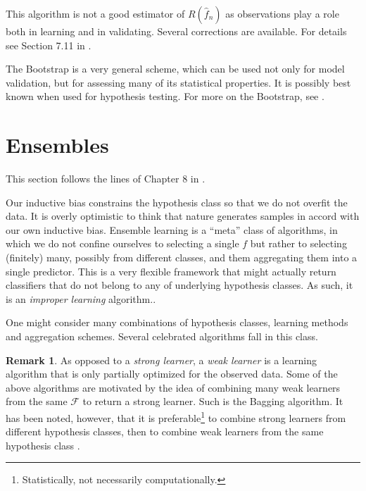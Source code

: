 \documentclass[12pt,a4paper]{article}
\theoremstyle{plain}
\theoremstyle{definition}
\newtheorem{remark}{Remark}
\newcommand{\risk}{R}
\newcommand{\hyp}{f}
\newcommand{\hypclass}{\mathcal{F}}
\newcommand{\EPE}{\risk(\hat{\hyp}_n)}
\begin{document}
This algorithm is not a good estimator of $\EPE$ as observations play a role both in learning and in validating. 
Several corrections are available. For details see Section 7.11 in \cite{hastie_elements_2003}.

The Bootstrap is a very general scheme, which can be used not only for model validation, but for assessing many of its statistical properties. It is possibly best known when used for hypothesis testing. 
For more on the Bootstrap, see \cite{efron_introduction_1994}.


\section{Ensembles}
\label{sec:ensembles}

This section follows the lines of Chapter 8 in \cite{hastie_elements_2003}.

Our inductive bias constrains the hypothesis class so that we do not overfit the data. 
It is overly optimistic to think that nature generates samples in accord with our own inductive bias.
Ensemble learning is a ``meta'' class of algorithms, in which we do not confine ourselves to selecting a single $\hyp$ but rather to selecting (finitely) many, possibly from different classes, and them aggregating them into a single predictor.
This is a very flexible framework that might actually return classifiers that do not belong to any of underlying hypothesis classes. As such, it is an \emph{improper learning} algorithm..

One might consider many combinations of hypothesis classes, learning methods and aggregation schemes.
Several celebrated algorithms fall in this class. 



\begin{remark}
As opposed to a \emph{strong learner}, a \emph{weak learner} is a learning algorithm that is only partially optimized for the observed data. 
Some of the above algorithms are motivated by the idea of combining many weak learners from the same $\hypclass$ to return a strong learner. 
Such is the Bagging algorithm. 
It has been noted, however, that it is preferable\footnote{Statistically, not necessarily computationally.}  to combine strong learners from different hypothesis classes, then to combine weak learners from the same hypothesis class \cite{gashler_decision_2008}.
\end{remark}
\end{document}
